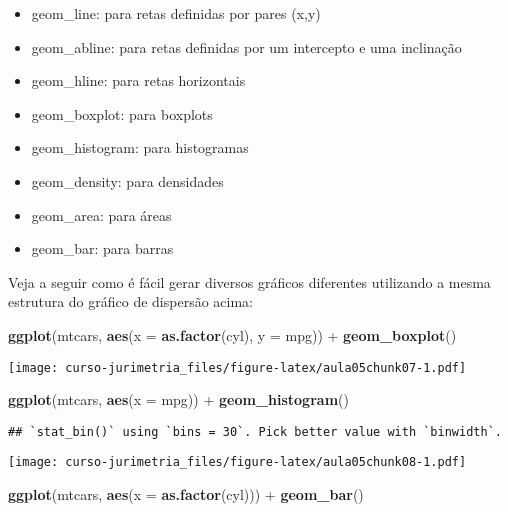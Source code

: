 \documentclass[]{book}
\newenvironment{Shaded}{\begin{snugshade}}{\end{snugshade}}
\newcommand{\KeywordTok}[1]{\textcolor[rgb]{0.13,0.29,0.53}{\textbf{{#1}}}}
\newcommand{\DataTypeTok}[1]{\textcolor[rgb]{0.13,0.29,0.53}{{#1}}}
\newcommand{\StringTok}[1]{\textcolor[rgb]{0.31,0.60,0.02}{{#1}}}
\newcommand{\NormalTok}[1]{{#1}}
\providecommand{\tightlist}{%
  \setlength{\itemsep}{0pt}\setlength{\parskip}{0pt}}
\begin{document}
\begin{itemize}
\tightlist
\item
  geom\_line: para retas definidas por pares (x,y)
\item
  geom\_abline: para retas definidas por um intercepto e uma inclinação
\item
  geom\_hline: para retas horizontais
\item
  geom\_boxplot: para boxplots
\item
  geom\_histogram: para histogramas
\item
  geom\_density: para densidades
\item
  geom\_area: para áreas
\item
  geom\_bar: para barras
\end{itemize}

Veja a seguir como é fácil gerar diversos gráficos diferentes utilizando
a mesma estrutura do gráfico de dispersão acima:

\begin{Shaded}
\begin{Highlighting}[]
\KeywordTok{ggplot}\NormalTok{(mtcars, }\KeywordTok{aes}\NormalTok{(}\DataTypeTok{x =} \KeywordTok{as.factor}\NormalTok{(cyl), }\DataTypeTok{y =} \NormalTok{mpg)) +}\StringTok{ }
\StringTok{  }\KeywordTok{geom_boxplot}\NormalTok{()}
\end{Highlighting}
\end{Shaded}

\texttt{[image: curso-jurimetria\_files/figure-latex/aula05chunk07-1.pdf]}

\begin{Shaded}
\begin{Highlighting}[]
\KeywordTok{ggplot}\NormalTok{(mtcars, }\KeywordTok{aes}\NormalTok{(}\DataTypeTok{x =} \NormalTok{mpg)) +}\StringTok{ }
\StringTok{  }\KeywordTok{geom_histogram}\NormalTok{()}
\end{Highlighting}
\end{Shaded}

\begin{verbatim}
## `stat_bin()` using `bins = 30`. Pick better value with `binwidth`.
\end{verbatim}

\texttt{[image: curso-jurimetria\_files/figure-latex/aula05chunk08-1.pdf]}

\begin{Shaded}
\begin{Highlighting}[]
\KeywordTok{ggplot}\NormalTok{(mtcars, }\KeywordTok{aes}\NormalTok{(}\DataTypeTok{x =} \KeywordTok{as.factor}\NormalTok{(cyl))) +}\StringTok{ }
\StringTok{  }\KeywordTok{geom_bar}\NormalTok{()}
\end{Highlighting}
\end{Shaded}
\end{document}
